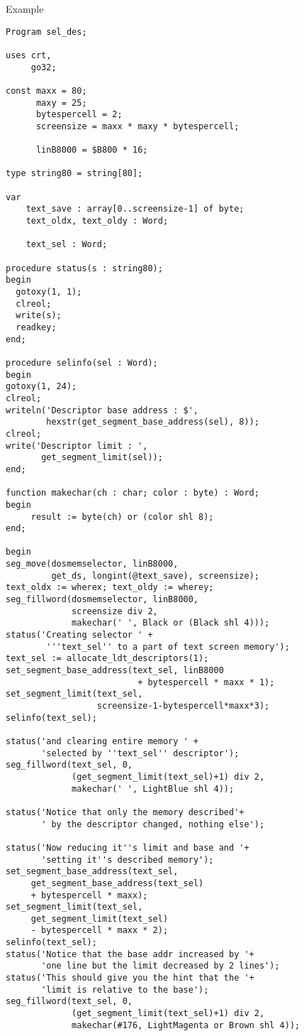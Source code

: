 \begin{FPCList}
\item[Example]
\begin{verbatim}
Program sel_des;

uses crt,
     go32;

const maxx = 80;
      maxy = 25;
      bytespercell = 2;
      screensize = maxx * maxy * bytespercell;

      linB8000 = $B800 * 16;

type string80 = string[80];

var
    text_save : array[0..screensize-1] of byte;
    text_oldx, text_oldy : Word;

    text_sel : Word;

procedure status(s : string80);
begin
  gotoxy(1, 1); 
  clreol; 
  write(s); 
  readkey;
end;

procedure selinfo(sel : Word);
begin
gotoxy(1, 24);
clreol; 
writeln('Descriptor base address : $', 
        hexstr(get_segment_base_address(sel), 8));
clreol; 
write('Descriptor limit : ', 
       get_segment_limit(sel));
end;

function makechar(ch : char; color : byte) : Word;
begin
     result := byte(ch) or (color shl 8);
end;

begin
seg_move(dosmemselector, linB8000, 
         get_ds, longint(@text_save), screensize);
text_oldx := wherex; text_oldy := wherey;
seg_fillword(dosmemselector, linB8000, 
             screensize div 2, 
             makechar(' ', Black or (Black shl 4)));
status('Creating selector ' + 
        '''text_sel'' to a part of text screen memory');
text_sel := allocate_ldt_descriptors(1);
set_segment_base_address(text_sel, linB8000 
                          + bytespercell * maxx * 1);
set_segment_limit(text_sel, 
                  screensize-1-bytespercell*maxx*3);
selinfo(text_sel);

status('and clearing entire memory ' + 
       'selected by ''text_sel'' descriptor');
seg_fillword(text_sel, 0, 
             (get_segment_limit(text_sel)+1) div 2, 
             makechar(' ', LightBlue shl 4));

status('Notice that only the memory described'+
       ' by the descriptor changed, nothing else');

status('Now reducing it''s limit and base and '+
       'setting it''s described memory');
set_segment_base_address(text_sel, 
     get_segment_base_address(text_sel) 
     + bytespercell * maxx);
set_segment_limit(text_sel, 
     get_segment_limit(text_sel) 
     - bytespercell * maxx * 2);
selinfo(text_sel);
status('Notice that the base addr increased by '+
       'one line but the limit decreased by 2 lines');
status('This should give you the hint that the '+
       'limit is relative to the base');
seg_fillword(text_sel, 0, 
             (get_segment_limit(text_sel)+1) div 2, 
             makechar(#176, LightMagenta or Brown shl 4));


\end{verbatim}
\end{FPCList}
